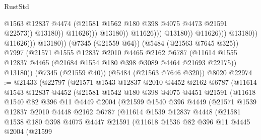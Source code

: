 \begin{lexlean}{RustStd}
\begin{coremodule}
{\begin{coremodule}
{{{{{{{{{{{{{{{{{{{{{{{{{{{{{{{                                                    @1563
                                                    @12837
                                                    @4474
                                                    (@21581
                                                      @1562
                                                      @180
                                                      @398
                                                      @4075
                                                      @4473
                                                      @21591
                                                      @22573))
                                                  @13180))
                                              @11626)))
                                        @13180))
                                    @11626)))
                              @13180))
                          @11626)))
                    @13180))
                @11626)))
          @13180))
      (@7345 (@21559 @64))
      (@5484 (@21563 @7645 @325))
      @7997
      (@21571
        @1555
        @12837
        @2010
        @4465
        @2162
        @6787
        (@11614 @1555 @12837 @4465 (@21684 @1554 @180 @398 @3089 @4464 @21693 @22175))
        @13180))
    (@7345 (@21559 @40))
    (@5484 (@21563 @7646 @320))
    @8020
@22974 := @21433
    (@22797
      (@21571
        @1543
        @12837
        @2010
        @4452
        @2162
        @6787
        (@11614
          @1543
          @12837
          @4452
          (@21581
            @1542
            @180
            @398
            @4075
            @4451
            @21591
            (@11618
              @1540
              @82
              @396
              @11
              @4449
              @2004
              (@21599
                @1540
                @396
                @4449
                (@21571
                  @1539
                  @12837
                  @2010
                  @4448
                  @2162
                  @6787
                  (@11614
                    @1539
                    @12837
                    @4448
                    (@21581
                      @1538
                      @180
                      @398
                      @4075
                      @4447
                      @21591
                      (@11618
                        @1536
                        @82
                        @396
                        @11
                        @4445
                        @2004
                        (@21599
}}}}}}}}}}}}}}}}}}}}}}}}}}}}}}}
\end{coremodule}}
\end{coremodule}
\end{lexlean}
